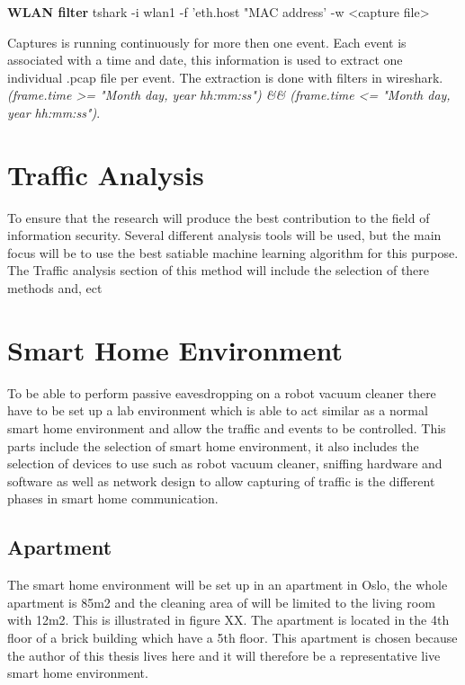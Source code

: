 \textbf{WLAN filter}
\newline
tshark -i wlan1 -f 'eth.host "MAC address' -w <capture file>
\newline
\newline

Captures is running continuously for more then one event. Each event is associated with a time and date, this information is used to extract one individual .pcap file per event. The extraction is done with filters in wireshark. 
\textit{(frame.time >= "Month day, year hh:mm:ss") \&\& (frame.time <= "Month day, year hh:mm:ss")}.



\section{Traffic Analysis}
To ensure that the research will produce the best contribution to the field of information security. Several different analysis tools will be used, but the main focus will be to use the best satiable machine learning algorithm for this purpose. The Traffic analysis section of this method will include the selection of there methods and, ect    

\section{Smart Home Environment}
To be able to perform passive eavesdropping on a robot vacuum cleaner there have to be set up a lab environment which is able to act similar as a normal smart home environment and allow the traffic and events to be controlled. This parts include the selection of smart home environment, it also includes the selection of devices to use such as robot vacuum cleaner, sniffing hardware and software as well as network design to allow capturing of traffic is the different phases in smart home communication. 

\subsection{Apartment}
The smart home environment will be set up in an apartment in Oslo, the whole apartment is 85m2 and the cleaning area of will be limited to the living room with 12m2. This is illustrated in figure XX. The apartment is located in the 4th floor of a brick building which have a 5th floor. This apartment is chosen because the author of this thesis lives here and it will therefore be a representative live smart home environment.

